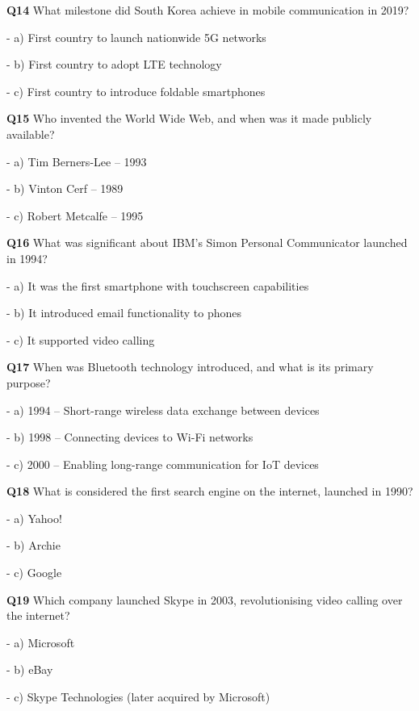 \textbf{Q14} What milestone did South Korea achieve in mobile communication in 2019?\par
\quad - a) First country to launch nationwide 5G networks\par
\quad - b) First country to adopt LTE technology\par
\quad - c) First country to introduce foldable smartphones\par

\textbf{Q15} Who invented the World Wide Web, and when was it made publicly available?\par
\quad - a) Tim Berners-Lee – 1993\par
\quad - b) Vinton Cerf – 1989\par
\quad - c) Robert Metcalfe – 1995\par

\textbf{Q16} What was significant about IBM's Simon Personal Communicator launched in 1994?\par
\quad - a) It was the first smartphone with touchscreen capabilities\par
\quad - b) It introduced email functionality to phones\par
\quad - c) It supported video calling\par

\textbf{Q17} When was Bluetooth technology introduced, and what is its primary purpose?\par
\quad - a) 1994 – Short-range wireless data exchange between devices\par
\quad - b) 1998 – Connecting devices to Wi-Fi networks\par
\quad - c) 2000 – Enabling long-range communication for IoT devices\par

\textbf{Q18} What is considered the first search engine on the internet, launched in 1990?\par
\quad - a) Yahoo!\par
\quad - b) Archie\par
\quad - c) Google\par

\textbf{Q19} Which company launched Skype in 2003, revolutionising video calling over the internet?\par
\quad - a) Microsoft\par
\quad - b) eBay\par
\quad - c) Skype Technologies (later acquired by Microsoft)\par

